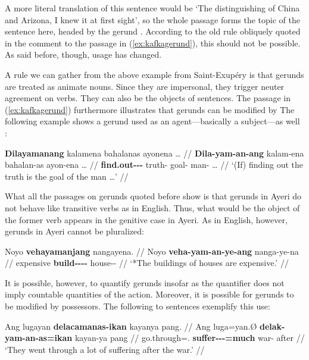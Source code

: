 A more literal translation of this sentence would be `The distinguishing of 
China and Arizona, I knew it at first sight', so the whole passage 
 forms the topic of the 
sentence here, headed by the gerund 
. According to the old rule 
obliquely quoted in the comment to the passage in (\ref{ex:kafkagerund}), this 
should not be possible. As said before, though, usage has changed.

A rule we can gather from the above example from Saint-Exupéry is that gerunds 
are treated as animate nouns. Since they are impersonal, they trigger neuter 
agreement on verbs. They can also be the objects of sentences. The passage in 
(\ref{ex:kafkagerund}) furthermore illustrates that gerunds can be modified by 
The following example shows a gerund used as an agent---basically a 
subject---as well \citep{benung:scientificmethod}:

\ex\label{ex:scimethgerund}\begingl
	\gla \textbf{Dilayamanang} kalamena bahalanas ayonena … //
	\glb \textbf{Dila-yam-an-ang} kalam-ena bahalan-as ayon-ena … //
	\glc \textbf{find.out-\Ptcp{}-\Nmlz{}-\Aarg{}} truth-\Gen{} 
		goal-\Parg{} man-\Gen{} … //
	\glft `(If) finding out the truth is the goal of the man …' //
\endgl\xe

What all the passages on gerunds quoted before show is that gerunds in Ayeri 
do not behave like transitive verbs as in English. Thus, what would be the 
object of the former verb appears in the genitive case in Ayeri. As in English, 
however, gerunds in Ayeri cannot be pluralized:

\ex\begingl
	\gla *Noyo \textbf{vehayamanjang} nangayena. //
	\glb Noyo \textbf{veha-yam-an-ye-ang} nanga-ye-na //
	\glc expensive \textbf{build-\Ptcp{}-\Nmlz{}-\Pl{}-\Aarg{}} 
		house-\Pl{}-\Gen{} //
	\glft `*The buildings of houses are expensive.' //
\endgl\xe

It is possible, however, to quantify gerunds insofar as the quantifier does not 
imply countable quantities of the action. Moreover, it is possible for gerunds 
to be modified by possessors. The following to sentences exemplify this use:

\ex\begingl
	\gla Ang lugayan \textbf{delacamanas-ikan} kayanya pang. //
	\glb Ang luga=yan.Ø \textbf{delak-yam-an-as=ikan} kayan-ya pang //
	\glc \AgtT{} go.through=\TplM{}.\Top{} 
		\textbf{suffer-\Ptcp{}-\Nmlz{}-\Parg{}=much} war-\Loc{} after //
	\glft `They went through a lot of suffering after the war.' //
\endgl\xe

